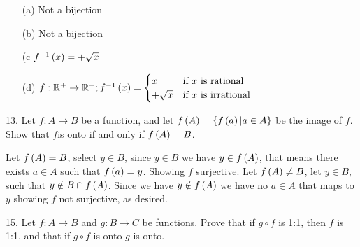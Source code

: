 \begin{mdframed}[style=darkAnswer,frametitle={Joe Starr}]
  \begin{itemize}
    \item [(a)]{
          Not a bijection
          }
    \item [(b)]{
          Not a bijection
          }
    \item [(c]{
          $f^{-1}\left(x\right)=+\sqrt{x}$
          }
    \item [(d)]{
          $f:\mathbb{R}^+\to \mathbb{R}^+; f^{-1}\left(x\right)=
            \begin{cases}
              x         & \text{if }x\text{ is rational}   \\
              +\sqrt{x} & \text{if }x\text{ is irrational} \\
            \end{cases}$
          }
  \end{itemize}
\end{mdframed}
\newpage
\begin{mdframed}[style=darkQuesion]
  13. Let $f:A\to B$ be a function, and let $f\left(A\right)=\left\{f\left(a\right)\vert a\in A\right\}$
  be the image of $f$. Show that $f$is onto if and only if $f\left(A\right)=B$.
\end{mdframed}

\begin{mdframed}[style=darkAnswer,frametitle={Joe Starr}]
  Let $f\left(A\right)=B$, select $y\in B$, since $y\in B$ we have $y\in f\left(A\right)$, that
  means there exists $a\in A$ such that $f\left(a\right)=y$. Showing $f$ surjective.
  Let $f\left(A\right)\neq B$, let $y\in B$, such that $y\notin B \cap f\left(A\right)$. Since we
  have $y\notin f\left(A\right)$ we have no $a\in A$ that maps to $y$ showing $f$ not
  surjective, as desired.
\end{mdframed}
\newpage
\begin{mdframed}[style=darkQuesion]
  15. Let $f:A\to B$ and $g:B\to C$ be functions. Prove that if $g\circ f$ is
  1:1, then $f$ is 1:1, and that if $g\circ f$ is onto $g$ is onto.
\end{mdframed}

